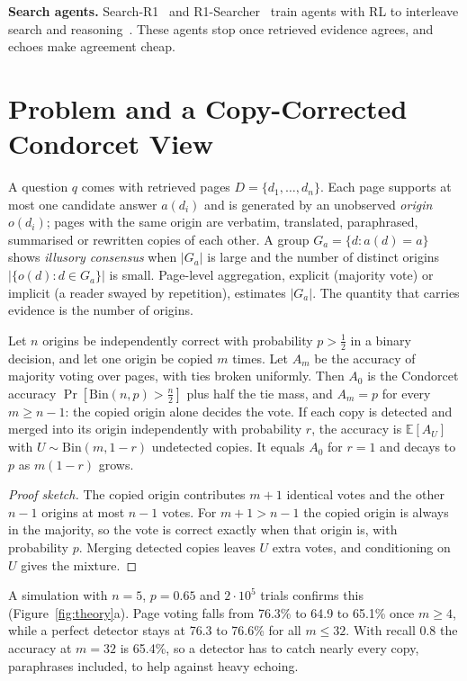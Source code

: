 \documentclass[sigconf,review,anonymous]{acmart}
\newcommand{\para}[1]{\smallskip\noindent\textbf{#1}\enspace}
\begin{document}
\para{Search agents.} Search-R1~\cite{jin2025searchr1} and R1-Searcher~\cite{song2025r1searcher} train agents with RL to
interleave search and reasoning~\cite{lin2025agenticsearch}. These agents stop once retrieved evidence agrees, and
echoes make agreement cheap.

\section{Problem and a Copy-Corrected Condorcet View}\label{sec:theory}
A question $q$ comes with retrieved pages $D=\{d_1,\dots,d_n\}$. Each page supports at most one candidate answer
$a(d_i)$ and is generated by an unobserved \emph{origin} $o(d_i)$; pages with the same origin are verbatim, translated,
paraphrased, summarised or rewritten copies of each other. A group $G_a=\{d: a(d)=a\}$ shows \emph{illusory consensus}
when $|G_a|$ is large and the number of distinct origins $|\{o(d):d\in G_a\}|$ is small. Page-level aggregation,
explicit (majority vote) or implicit (a reader swayed by repetition), estimates $|G_a|$. The quantity that carries
evidence is the number of origins.

\begin{proposition}\label{prop}
Let $n$ origins be independently correct with probability $p>\frac12$ in a binary decision, and let one origin be
copied $m$ times. Let $A_m$ be the accuracy of majority voting over pages, with ties broken uniformly. Then $A_0$ is
the Condorcet accuracy $\Pr[\mathrm{Bin}(n,p)>\frac n2]$ plus half the tie mass, and $A_m=p$ for every $m\geq n-1$:
the copied origin alone decides the vote. If each copy is detected and merged into its origin independently with
probability $r$, the accuracy is $\mathbb{E}[A_U]$ with $U\sim\mathrm{Bin}(m,1-r)$ undetected copies. It equals $A_0$
for $r=1$ and decays to $p$ as $m(1-r)$ grows.
\end{proposition}
\begin{proof}[Proof sketch]
The copied origin contributes $m{+}1$ identical votes and the other $n{-}1$ origins at most $n{-}1$ votes. For $m+1>n-1$
the copied origin is always in the majority, so the vote is correct exactly when that origin is, with probability $p$.
Merging detected copies leaves $U$ extra votes, and conditioning on $U$ gives the mixture.
\end{proof}
A simulation with $n{=}5$, $p{=}0.65$ and $2\cdot10^5$ trials confirms this (Figure~\ref{fig:theory}a). Page voting
falls from 76.3\% to 64.9 to 65.1\% once $m\geq4$, while a perfect detector stays at 76.3 to 76.6\% for all $m\leq32$.
With recall $0.8$ the accuracy at $m{=}32$ is 65.4\%, so a detector has to catch nearly every copy, paraphrases
included, to help against heavy echoing.
\end{document}
